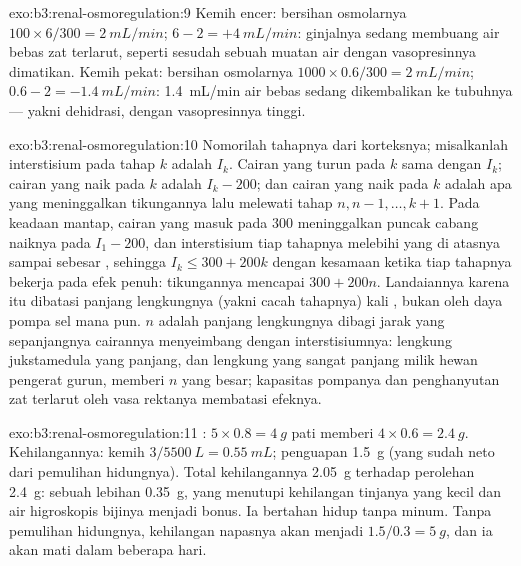 \begin{solution}{exo:b3:renal-osmoregulation:9}
Kemih encer: bersihan osmolarnya $100\times 6/300 = \qty{2}{mL/min}$;
 $6 - 2 = +\qty{4}{mL/min}$: ginjalnya sedang membuang
air bebas zat terlarut, seperti sesudah sebuah muatan air dengan vasopresinnya dimatikan.
Kemih pekat: bersihan osmolarnya $1000\times 0.6/300 =
\qty{2}{mL/min}$;  $0.6 - 2 = -\qty{1.4}{mL/min}$:
\qty{1.4}{mL/min} air bebas sedang dikembalikan ke tubuhnya ---
yakni dehidrasi, dengan vasopresinnya tinggi.
\end{solution}

\begin{solution}{exo:b3:renal-osmoregulation:10}
Nomorilah tahapnya dari korteksnya; misalkanlah interstisium pada tahap $k$
adalah $I_{k}$. Cairan yang turun pada $k$ sama dengan $I_{k}$; cairan yang
naik pada $k$ adalah $I_{k} - 200$; dan cairan yang naik pada $k$ adalah apa yang
meninggalkan tikungannya lalu melewati tahap $n, n-1, \dots, k+1$. Pada keadaan mantap,
cairan yang masuk pada \qty{300}{} meninggalkan puncak cabang naiknya
pada $I_{1} - 200$, dan interstisium tiap tahapnya melebihi yang di atasnya
sampai sebesar , sehingga $I_{k} \le 300 + 200k$ dengan kesamaan ketika
tiap tahapnya bekerja pada efek penuh: tikungannya mencapai $300 + 200n$. Landaiannya
karena itu dibatasi panjang lengkungnya (yakni cacah
tahapnya) kali , bukan oleh daya pompa sel mana pun. $n$
adalah panjang lengkungnya dibagi jarak yang sepanjangnya cairannya
menyeimbang dengan interstisiumnya: lengkung jukstamedula yang panjang, dan
lengkung yang sangat panjang milik hewan pengerat gurun, memberi $n$ yang besar; kapasitas pompanya
dan penghanyutan zat terlarut oleh vasa rektanya membatasi efeknya.
\end{solution}

\begin{solution}{exo:b3:renal-osmoregulation:11}
: $5\times 0.8 = \qty{4}{g}$ pati memberi $4\times 0.6
= \qty{2.4}{g}$. Kehilangannya: kemih $3/5500\ \unit{L} = \qty{0.55}{mL}$;
penguapan \qty{1.5}{g} (yang sudah neto dari pemulihan hidungnya). Total
kehilangannya \qty{2.05}{g} terhadap perolehan \qty{2.4}{g}: sebuah lebihan
\qty{0.35}{g}, yang menutupi kehilangan tinjanya yang kecil dan air higroskopis
bijinya menjadi bonus. Ia bertahan hidup tanpa minum. Tanpa
pemulihan hidungnya, kehilangan napasnya akan menjadi $1.5/0.3 = \qty{5}{g}$,
dan ia akan mati dalam beberapa hari.
\end{solution}

